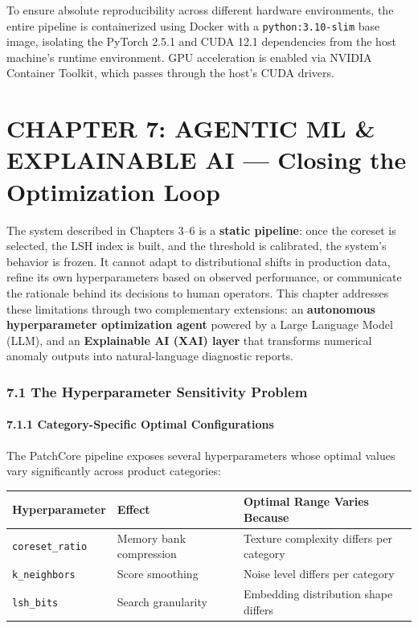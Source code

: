\documentclass[12pt, a4paper, oneside]{report}
\begin{document}
To ensure absolute reproducibility across different hardware environments, the entire pipeline is containerized using Docker with a \texttt{python:3.10-slim} base image, isolating the PyTorch 2.5.1 and CUDA 12.1 dependencies from the host machine's runtime environment. GPU acceleration is enabled via NVIDIA Container Toolkit, which passes through the host's CUDA drivers.

\bigskip\noindent\hrulefill\bigskip

\chapter{CHAPTER 7: AGENTIC ML \& EXPLAINABLE AI --- Closing the Optimization Loop}\label{chapter-7-agentic-ml-explainable-ai-closing-the-optimization-loop}

The system described in Chapters 3--6 is a \textbf{static pipeline}: once the coreset is selected, the LSH index is built, and the threshold is calibrated, the system's behavior is frozen. It cannot adapt to distributional shifts in production data, refine its own hyperparameters based on observed performance, or communicate the rationale behind its decisions to human operators. This chapter addresses these limitations through two complementary extensions: an \textbf{autonomous hyperparameter optimization agent} powered by a Large Language Model (LLM), and an \textbf{Explainable AI (XAI) layer} that transforms numerical anomaly outputs into natural-language diagnostic reports.

\bigskip\noindent\hrulefill\bigskip

\subsection{7.1 The Hyperparameter Sensitivity Problem}\label{the-hyperparameter-sensitivity-problem}

\subsubsection{7.1.1 Category-Specific Optimal Configurations}\label{category-specific-optimal-configurations}

The PatchCore pipeline exposes several hyperparameters whose optimal values vary significantly across product categories:

{\def\LTcaptype{none} %
\begin{longtable}[]{@{}lll@{}}
\toprule\noalign{}
Hyperparameter & Effect & Optimal Range Varies Because \\
\midrule\noalign{}
\endhead
\bottomrule\noalign{}
\endlastfoot
\texttt{coreset\_ratio} & Memory bank compression & Texture complexity differs per category \\
\texttt{k\_neighbors} & Score smoothing & Noise level differs per category \\
\texttt{lsh\_bits} & Search granularity & Embedding distribution shape differs \\
\end{longtable}
}
\end{document}
